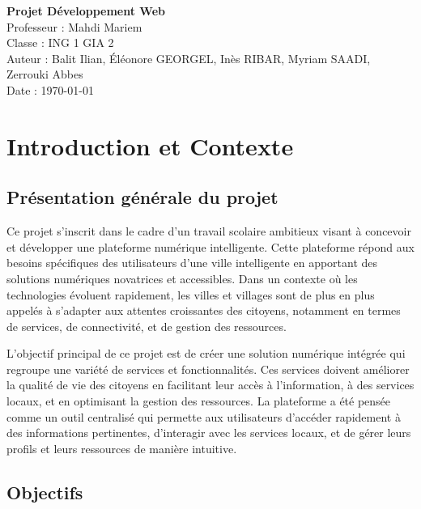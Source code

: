 \documentclass[a4paper,12pt]{report}
\begin{document}
	
	\begin{titlepage}
		\centering
		\vspace*{2cm}
		\Huge{\textbf{Projet Développement Web}} \\[1cm]
		\Large{Professeur : Mahdi Mariem} \\[2cm]
		\vfill
		\Large{
			Classe : ING 1 GIA 2 \\
			Auteur : Balit Ilian, Éléonore GEORGEL, Inès RIBAR, Myriam SAADI, Zerrouki Abbes \\
			Date : \today \\
		}
	\end{titlepage}
	
	\tableofcontents
	\newpage
	
	\section{Introduction et Contexte}
	
	\subsection{Présentation générale du projet}
	
	Ce projet s'inscrit dans le cadre d'un travail scolaire ambitieux visant à concevoir et développer une plateforme numérique intelligente. Cette plateforme répond aux besoins spécifiques des utilisateurs d'une ville intelligente en apportant des solutions numériques novatrices et accessibles. Dans un contexte où les technologies évoluent rapidement, les villes et villages sont de plus en plus appelés à s'adapter aux attentes croissantes des citoyens, notamment en termes de services, de connectivité, et de gestion des ressources.
	
	L’objectif principal de ce projet est de créer une solution numérique intégrée qui regroupe une variété de services et fonctionnalités. Ces services doivent améliorer la qualité de vie des citoyens en facilitant leur accès à l’information, à des services locaux, et en optimisant la gestion des ressources. La plateforme a été pensée comme un outil centralisé qui permette aux utilisateurs d’accéder rapidement à des informations pertinentes, d’interagir avec les services locaux, et de gérer leurs profils et leurs ressources de manière intuitive.
	
	\subsection{Objectifs}
	
\end{document}
